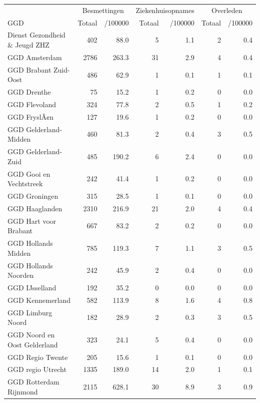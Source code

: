 \documentclass[
  english,
  man,floatsintext]{apa6}
\begin{document}
\begin{table}[H]
\centering\begingroup\fontsize{10}{12}\selectfont

\begin{threeparttable}
\begin{tabular}{lrrrrrr}
\toprule
\multicolumn{1}{c}{ } & \multicolumn{2}{c}{Besmettingen} & \multicolumn{2}{c}{Ziekenhuisopnames} & \multicolumn{2}{c}{Overleden} \\
\cmidrule(l{3pt}r{3pt}){2-3} \cmidrule(l{3pt}r{3pt}){4-5} \cmidrule(l{3pt}r{3pt}){6-7}
GGD & Totaal & /100000 & Totaal & /100000 & Totaal & /100000\\
\midrule
Dienst Gezondheid \& Jeugd ZHZ & 402 & 88.0 & 5 & 1.1 & 2 & 0.4\\
GGD Amsterdam & 2786 & 263.3 & 31 & 2.9 & 4 & 0.4\\
GGD Brabant Zuid-Oost & 486 & 62.9 & 1 & 0.1 & 1 & 0.1\\
GGD Drenthe & 75 & 15.2 & 1 & 0.2 & 0 & 0.0\\
GGD Flevoland & 324 & 77.8 & 2 & 0.5 & 1 & 0.2\\
GGD FryslÃ¢n & 127 & 19.6 & 1 & 0.2 & 0 & 0.0\\
GGD Gelderland-Midden & 460 & 81.3 & 2 & 0.4 & 3 & 0.5\\
GGD Gelderland-Zuid & 485 & 190.2 & 6 & 2.4 & 0 & 0.0\\
GGD Gooi en Vechtstreek & 242 & 41.4 & 1 & 0.2 & 0 & 0.0\\
GGD Groningen & 315 & 28.5 & 1 & 0.1 & 0 & 0.0\\
GGD Haaglanden & 2310 & 216.9 & 21 & 2.0 & 4 & 0.4\\
GGD Hart voor Brabant & 667 & 83.2 & 2 & 0.2 & 0 & 0.0\\
GGD Hollands Midden & 785 & 119.3 & 7 & 1.1 & 3 & 0.5\\
GGD Hollands Noorden & 242 & 45.9 & 2 & 0.4 & 0 & 0.0\\
GGD IJsselland & 192 & 35.2 & 0 & 0.0 & 0 & 0.0\\
GGD Kennemerland & 582 & 113.9 & 8 & 1.6 & 4 & 0.8\\
GGD Limburg Noord & 182 & 28.9 & 2 & 0.3 & 3 & 0.5\\
GGD Noord en Oost Gelderland & 323 & 24.1 & 5 & 0.4 & 0 & 0.0\\
GGD Regio Twente & 205 & 15.6 & 1 & 0.1 & 0 & 0.0\\
GGD regio Utrecht & 1335 & 189.0 & 14 & 2.0 & 1 & 0.1\\
GGD Rotterdam Rijnmond & 2115 & 628.1 & 30 & 8.9 & 3 & 0.9\\

\end{tabular}
\end{threeparttable}
\end{table}
\end{document}
